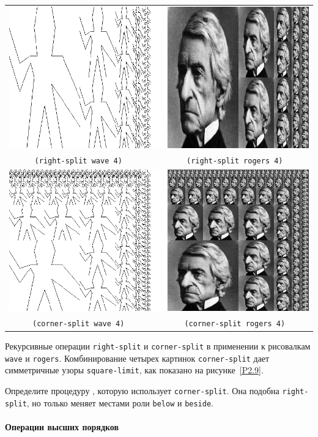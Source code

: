 \begin{cntrfig}
\begin{tabular}{cc}
\multicolumn{2}{c}{\includegraphics{xfig-mod/2-14-1.eps}} \\
\tt{(right-split wave 4)}  & \tt{(right-split rogers 4)}\\[8pt]
\multicolumn{2}{c}{\includegraphics{xfig-mod/2-14-2.eps}} \\
\tt{(corner-split wave 4)} & \tt{(corner-split rogers 4)}
\end{tabular}

\caption{Рекурсивные операции
{\tt right-split} и {\tt corner-split} в применении к
рисовалкам {\tt wave} и {\tt rogers}. Комбинирование
четырех картинок {\tt corner-split} дает симметричные узоры
{\tt square-limit}, как показано на рисунке~\ref{P2.9}.}
\label{P2.14}
\end{cntrfig}

\begin{exercise}{2.44}\label{EX2.44}%
Определите процедуру , которую
использует {\tt corner-split}.  Она подобна
{\tt right-split}, но только меняет местами роли
{\tt below} и {\tt beside}.
\end{exercise}
\paragraph{Операции высших порядков}


